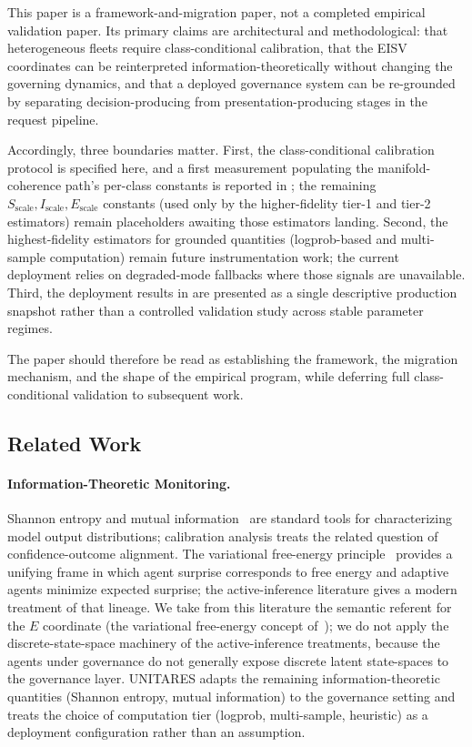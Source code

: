 \documentclass[11pt,twocolumn]{article}
\begin{document}
This paper is a framework-and-migration paper, not a completed
empirical validation paper. Its primary claims are architectural and
methodological: that heterogeneous fleets require class-conditional
calibration, that the EISV coordinates can be reinterpreted
information-theoretically without changing the governing dynamics, and
that a deployed governance system can be re-grounded by separating
decision-producing from presentation-producing stages in the request
pipeline.

Accordingly, three boundaries matter. First, the class-conditional
calibration protocol is specified here, and a first measurement
populating the manifold-coherence path's per-class constants is
reported in ; the remaining
$S_{\text{scale}}, I_{\text{scale}}, E_{\text{scale}}$ constants
(used only by the higher-fidelity tier-1 and tier-2 estimators)
remain placeholders awaiting those estimators landing. Second, the
highest-fidelity estimators for grounded quantities (logprob-based
and multi-sample computation) remain future instrumentation work;
the current deployment relies on degraded-mode fallbacks where
those signals are unavailable. Third, the deployment results in
 are presented as a single descriptive
production snapshot rather than a controlled validation study
across stable parameter regimes.

The paper should therefore be read as establishing the framework, the
migration mechanism, and the shape of the empirical program, while
deferring full class-conditional validation to subsequent work.

\subsection{Related Work}

\paragraph{Information-Theoretic Monitoring.}
Shannon entropy and mutual information~\cite{shannon1948} are standard tools for
characterizing model output distributions; calibration analysis
\cite{guo2017calibration} treats the related question of
confidence-outcome alignment. The variational free-energy
principle~\cite{friston2010free} provides a unifying frame in
which agent surprise corresponds to free energy and adaptive
agents minimize expected surprise; the active-inference literature
\cite{dacosta2020active,sajid2021active,smith2022step,parr2022active}
gives a modern treatment of that lineage. We take from this
literature the semantic referent for the $E$ coordinate (the
variational free-energy concept of~\cite{friston2010free}); we do
not apply the discrete-state-space machinery of the active-inference
treatments, because the agents under governance do not generally
expose discrete latent state-spaces to the governance layer.
UNITARES adapts the remaining information-theoretic quantities
(Shannon entropy, mutual information) to the governance setting
and treats the choice of computation tier (logprob, multi-sample,
heuristic) as a deployment configuration rather than an
assumption.
\end{document}
